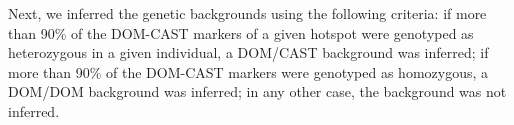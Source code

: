 \begin{mccorrection}


	

Next, we inferred the genetic backgrounds using the following criteria:
if more than 90\% of the DOM-CAST markers of a given hotspot were genotyped as heterozygous in a given individual, a DOM/CAST background was inferred;
if more than 90\% of the DOM-CAST markers were genotyped as homozygous, a DOM/DOM background was inferred;
in any other case, the background was not inferred.








\end{mccorrection}
